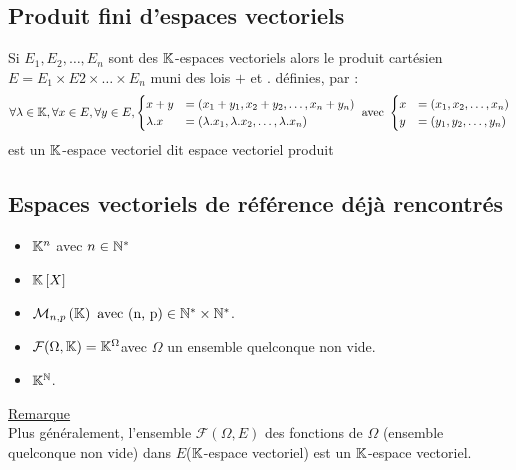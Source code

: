 \subsection{Produit fini d’espaces vectoriels}
\begin{defprop}
Si \(E_1, E_2, \dots, E_n\) sont des \(\mathbb{K}\)-espaces vectoriels alors le produit cartésien \(E = E_1 \times E2 \times \dots \times E_n \) muni des lois \(+\) et \(.\) définies, par :
\[\forall \lambda \in  \mathbb{K}, \forall x \in  E, \forall y \in  E,\begin{cases}
    x + y &= (x_1 + y_1, x_2 + y_2, \dots, x_n + y_n) \\
\lambda.x &= (\lambda.x_1, \lambda.x_2, \dots, \lambda.x_n)
\end{cases}\text{ avec } \begin{cases}
x &= (x_1, x_2, \dots, x_n)\\
y &= (y_1, y_2, \dots, y_n)
\end{cases}\]
est un \(\mathbb{K}\)-espace vectoriel dit espace vectoriel produit
\end{defprop}

\subsection{Espaces vectoriels de référence déjà rencontrés}
\begin{defprop}
    \begin{itemize}
    \item \(\mathbb{K}^n\) avec \(n \in  \mathbb{N}^*\)
    \item \(\mathbb{K} \left[X\right]\)
    \item \(\M{n,p} \text{ avec (n, p)} \in  \Ns \times \Ns\).
    \item \(\mathcal{F} (\Omega, \mathbb{K}) = \mathbb{K}^{\Omega} \)avec \(\Omega\) un ensemble quelconque non vide.
    \item \(\mathbb{K}^{\mathbb{N}}\).
    \end{itemize}
    \underline{Remarque}\\
    Plus généralement, l’ensemble \(\mathcal{F} (\Omega, E)\) des fonctions de \(\Omega\) (ensemble quelconque non vide) dans \(E\)(\(\mathbb{K}\)-espace vectoriel) est un \(\mathbb{K}\)-espace vectoriel.
\end{defprop}

